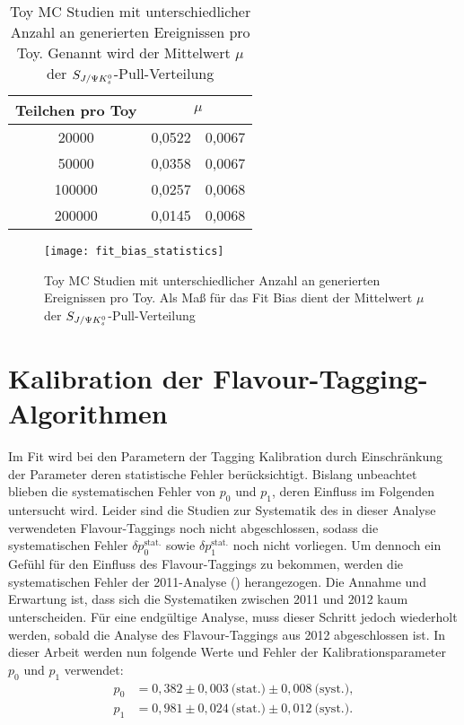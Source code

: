 \begin{table}[hptb]
\centering
\caption{Toy MC Studien mit unterschiedlicher Anzahl an generierten Ereignissen pro Toy. Genannt wird der Mittelwert $\mu$ der $S_{J/\Psi K_s^0}$-Pull-Verteilung}
\label{tab:fit_bias_events}
\begin{tabular}{cr@{$\pm$}l}
\hline \hline 
Teilchen pro Toy & \multicolumn{2}{c}{$\mu$}  \\ \hline
20000            &  0,0522 & 0,0067 \\
50000            &  0,0358 & 0,0067 \\
100000           &  0,0257 & 0,0068 \\
200000           &  0,0145 & 0,0068 \\ 
\hline \hline
\end{tabular}
\end{table}

\begin{figure}[hptb]
\centering
\texttt{[image: fit\_bias\_statistics]}
\caption{Toy MC Studien mit unterschiedlicher Anzahl an generierten Ereignissen pro Toy. Als Maß für das Fit Bias dient der Mittelwert $\mu$ der $S_{J/\Psi K_s^0}$-Pull-Verteilung}
\label{fig:fit_bias_events}
\end{figure}

\section{Kalibration der Flavour-Tagging-Algorithmen}
Im Fit wird bei den Parametern der Tagging Kalibration durch Einschränkung der Parameter deren statistische Fehler berücksichtigt. Bislang unbeachtet blieben die systematischen Fehler von $p_0$ und $p_1$, deren Einfluss im Folgenden untersucht wird. Leider sind die Studien zur Systematik des in dieser Analyse verwendeten Flavour-Taggings noch nicht abgeschlossen, sodass die systematischen Fehler $\delta p_0^{\text{stat.}}$ sowie $\delta p_1^{\text{stat.}}$ noch nicht vorliegen. Um dennoch ein Gefühl für den Einfluss des Flavour-Taggings zu bekommen, werden die systematischen Fehler der 2011-Analyse (\cite{lhcb-paper}) herangezogen. Die Annahme und Erwartung ist, dass sich die Systematiken zwischen 2011 und 2012 kaum unterscheiden. Für eine endgültige Analyse, muss dieser Schritt jedoch wiederholt werden, sobald die Analyse des Flavour-Taggings aus 2012 abgeschlossen ist. In dieser Arbeit werden nun folgende Werte und Fehler der Kalibrationsparameter $p_0$ und $p_1$ verwendet:
\begin{align}
p_0 &= 0,382 \pm 0,003\ \text{(stat.)} \pm 0,008\ \text{(syst.)}, \\
p_1 &= 0,981 \pm 0,024\ \text{(stat.)} \pm 0,012\ \text{(syst.)}.
\end{align}

